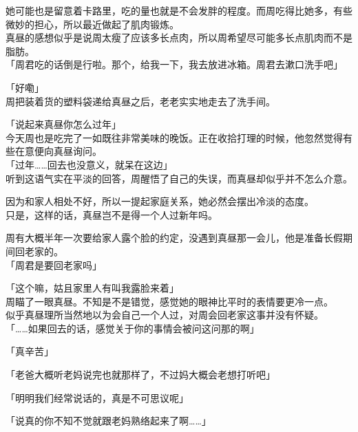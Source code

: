 她可能也是留意着卡路里，吃的量也就是不会发胖的程度。而周吃得比她多，有些微妙的担心，所以最近做起了肌肉锻炼。\\

真昼的感想似乎是说周太瘦了应该多长点肉，所以周希望尽可能多长点肌肉而不是脂肪。\\

「周君吃的话倒是行啦。那个，给我一下，我去放进冰箱。周君去漱口洗手吧」

「好嘞」\\

周把装着货的塑料袋递给真昼之后，老老实实地走去了洗手间。\\

\vspace{2\baselineskip}

「说起来真昼你怎么过年」\\

今天周也是吃完了一如既往非常美味的晚饭。正在收拾打理的时候，他忽然觉得有些在意便向真昼询问。\\

「过年……回去也没意义，就呆在这边」\\

听到这语气实在平淡的回答，周醒悟了自己的失误，而真昼却似乎并不怎么介意。

因为和家人相处不好，所以一提起家庭关系，她必然会摆出冷淡的态度。\\

只是，这样的话，真昼岂不是得一个人过新年吗。

周有大概半年一次要给家人露个脸的约定，没遇到真昼那一会儿，他是准备长假期间回老家的。\\

「周君是要回老家吗」

「这个嘛，姑且家里人有叫我露脸来着」\\

周瞄了一眼真昼。不知是不是错觉，感觉她的眼神比平时的表情要更冷一点。\\

似乎真昼理所当然地以为会自己一个人过，对周会回老家这事并没有怀疑。\\

「……如果回去的话，感觉关于你的事情会被问这问那的啊」

「真辛苦」

「老爸大概听老妈说完也就那样了，不过妈大概会老想打听吧」

「明明我们经常说话的，真是不可思议呢」

「说真的你不知不觉就跟老妈熟络起来了啊……」\\

